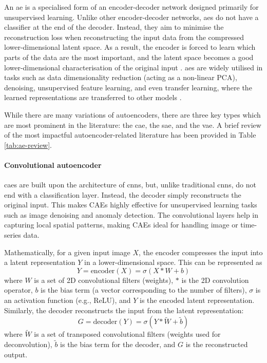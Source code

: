An \acrlong{ae} is a specialised form of an encoder-decoder network designed primarily for unsupervised learning. Unlike other encoder-decoder networks, \acrlong{ae}s do not have a classifier at the end of the decoder. Instead, they aim to minimise the reconstruction loss when reconstructing the input data from the compressed lower-dimensional latent space. As a result, the encoder is forced to learn which parts of the data are the most important, and the latent space becomes a good lower-dimensional characterisation of the original input \cite{ng_sparse_2010}. \Acrlong{ae}s are widely utilised in tasks such as data dimensionality reduction (acting as a non-linear PCA), denoising, unsupervised feature learning, and even transfer learning, where the learned representations are transferred to other models \cite{goodfellow_deep_2016}.

While there are many variations of autoencoders, there are three key types which are most prominent in the literature: the \acrfull{cae}, the \acrfull{sae}, and the \acrfull{vae}.
A brief review of the most impactful autoencoder-related literature has been provided in Table \ref{tab:ae-review}.

\paragraph{Convolutional autoencoder} \acrshort{cae}s are built upon the architecture of \acrshort{cnn}s, but, unlike traditional \acrshort{cnn}s, do not end with a classification layer. Instead, the decoder simply reconstructs the original input. This makes CAEs highly effective for unsupervised learning tasks such as image denoising and anomaly detection. The convolutional layers help in capturing local spatial patterns, making CAEs ideal for handling image or time-series data. 

Mathematically, for a given input image $X$, the encoder compresses the input into a latent representation $Y$ in a lower-dimensional space. This can be represented as
\[
Y = \text{encoder}(X) = \sigma(X * W + b)
\]
where $W$ is a set of 2D convolutional filters (weights), $*$ is the 2D convolution operator, $b$ is the bias term (a vector corresponding to the number of filters), $\sigma$ is an activation function (e.g., ReLU), and $Y$ is the encoded latent representation. Similarly, the decoder reconstructs the input from the latent representation:
\[
G = \text{decoder}(Y) = \sigma(Y * \tilde{W} + \tilde{b})
\]
where $\tilde{W}$ is a set of transposed convolutional filters (weights used for deconvolution), $\tilde{b}$ is the bias term for the decoder, and $G$ is the reconstructed output.

